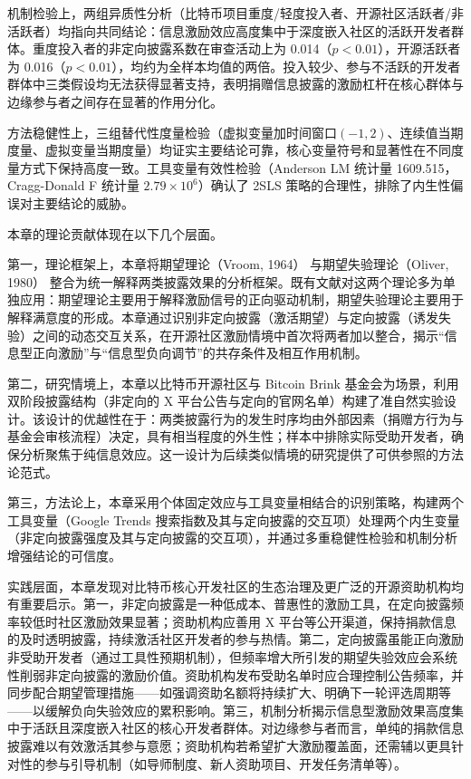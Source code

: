 \documentclass[
    type = master, %
    degree = professional,        %
    decl-page,  %
    twoside,                %
    fontset = fandol %
  ]{njuthesis}
\begin{document}
机制检验上，两组异质性分析（比特币项目重度/轻度投入者、开源社区活跃者/非活跃者）均指向共同结论：信息激励效应高度集中于深度嵌入社区的活跃开发者群体。重度投入者的非定向披露系数在审查活动上为 0.014（$p < 0.01$），开源活跃者为 0.016（$p < 0.01$），均约为全样本均值的两倍。投入较少、参与不活跃的开发者群体中三类假设均无法获得显著支持，表明捐赠信息披露的激励杠杆在核心群体与边缘参与者之间存在显著的作用分化。

方法稳健性上，三组替代性度量检验（虚拟变量加时间窗口$(-1, 2)$、连续值当期度量、虚拟变量当期度量）均证实主要结论可靠，核心变量符号和显著性在不同度量方式下保持高度一致。工具变量有效性检验（Anderson LM 统计量 1609.515，Cragg-Donald F 统计量 $2.79 \times 10^6$）确认了 2SLS 策略的合理性，排除了内生性偏误对主要结论的威胁。

本章的理论贡献体现在以下几个层面。

第一，理论框架上，本章将期望理论（Vroom, 1964）\cite{vroom1964work} 与期望失验理论（Oliver, 1980）\cite{oliver1980cognitive} 整合为统一解释两类披露效果的分析框架。既有文献对这两个理论多为单独应用：期望理论主要用于解释激励信号的正向驱动机制，期望失验理论主要用于解释满意度的形成。本章通过识别非定向披露（激活期望）与定向披露（诱发失验）之间的动态交互关系，在开源社区激励情境中首次将两者加以整合，揭示“信息型正向激励”与“信息型负向调节”的共存条件及相互作用机制。

第二，研究情境上，本章以比特币开源社区与 Bitcoin Brink 基金会为场景，利用双阶段披露结构（非定向的 X 平台公告与定向的官网名单）构建了准自然实验设计。该设计的优越性在于：两类披露行为的发生时序均由外部因素（捐赠方行为与基金会审核流程）决定，具有相当程度的外生性；样本中排除实际受助开发者，确保分析聚焦于纯信息效应。这一设计为后续类似情境的研究提供了可供参照的方法论范式。

第三，方法论上，本章采用个体固定效应与工具变量相结合的识别策略，构建两个工具变量（Google Trends 搜索指数及其与定向披露的交互项）处理两个内生变量（非定向披露强度及其与定向披露的交互项），并通过多重稳健性检验和机制分析增强结论的可信度。

实践层面，本章发现对比特币核心开发社区的生态治理及更广泛的开源资助机构均有重要启示。第一，非定向披露是一种低成本、普惠性的激励工具，在定向披露频率较低时社区激励效果显著；资助机构应善用 X 平台等公开渠道，保持捐款信息的及时透明披露，持续激活社区开发者的参与热情。第二，定向披露虽能正向激励非受助开发者（通过工具性预期机制），但频率增大所引发的期望失验效应会系统性削弱非定向披露的激励价值。资助机构发布受助名单时应合理控制公告频率，并同步配合期望管理措施——如强调资助名额将持续扩大、明确下一轮评选周期等——以缓解负向失验效应的累积影响。第三，机制分析揭示信息型激励效果高度集中于活跃且深度嵌入社区的核心开发者群体。对边缘参与者而言，单纯的捐款信息披露难以有效激活其参与意愿；资助机构若希望扩大激励覆盖面，还需辅以更具针对性的参与引导机制（如导师制度、新人资助项目、开发任务清单等）。
\end{document}
